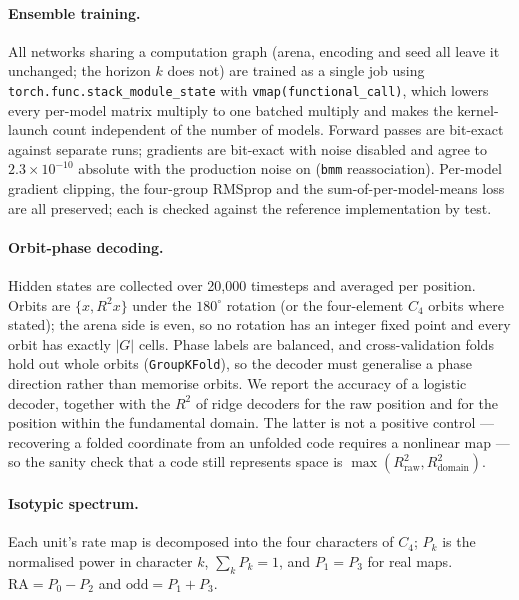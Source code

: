 \documentclass[9pt,lineno]{elife}
\begin{document}
\paragraph{Ensemble training.} All networks sharing a computation graph (arena, encoding and seed
all leave it unchanged; the horizon $k$ does not) are trained as a single job using
\texttt{torch.func.stack\_module\_state} with \texttt{vmap(functional\_call)}, which lowers every
per-model matrix multiply to one batched multiply and makes the kernel-launch count independent
of the number of models. Forward passes are bit-exact against separate runs; gradients are
bit-exact with noise disabled and agree to $2.3\times10^{-10}$ absolute with the production noise
on (\texttt{bmm} reassociation). Per-model gradient clipping, the four-group RMSprop and the
sum-of-per-model-means loss are all preserved; each is checked against the reference
implementation by test.

\paragraph{Orbit-phase decoding.} Hidden states are collected over 20{,}000 timesteps and averaged
per position. Orbits are $\{x, R^2x\}$ under the $180^\circ$ rotation (or the four-element $C_4$
orbits where stated); the arena side is even, so no rotation has an integer fixed point and every
orbit has exactly $|G|$ cells. Phase labels are balanced, and cross-validation folds hold out
whole orbits (\texttt{GroupKFold}), so the decoder must generalise a phase direction rather than
memorise orbits. We report the accuracy of a logistic decoder, together with the $R^2$ of ridge
decoders for the raw position and for the position within the fundamental domain. The latter is
not a positive control --- recovering a folded coordinate from an unfolded code requires a
nonlinear map --- so the sanity check that a code still represents space is
$\max(R^2_{\text{raw}}, R^2_{\text{domain}})$.

\paragraph{Isotypic spectrum.} Each unit's rate map is decomposed into the four characters of
$C_4$; $P_k$ is the normalised power in character $k$, $\sum_k P_k = 1$, and $P_1 = P_3$ for real
maps. $\mathrm{RA} = P_0 - P_2$ and $\mathrm{odd} = P_1 + P_3$.
\end{document}
